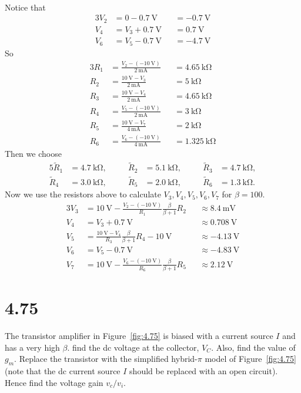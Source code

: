 \documentclass[12pt, a4paper]{article}
\begin{document}
\Ans \\
Notice that 
\begin{alignat*}{3}
  V_2 &= 0 - \SI{0.7}\V && = \SI{-0.7}{\V} \\
  V_4 &= V_3 + \SI{0.7}\V &&= \SI{0.7}\V \\
  V_6 &= V_5 - \SI{0.7}\V &&= \SI{-4.7}\V
\end{alignat*}
So 
\begin{alignat*}{3}
  R_1 &= \frac{V_2 - (\SI{-10}\V)}{\SI{2}\mA} &&= \SI{4.65}\kohm \\
  R_2 &= \frac{\SI{10}\V - V_3}{\SI{2}\mA} &&= \SI{5}\kohm \\
  R_3 &= \frac{\SI{10}\V - V_4}{\SI{2}\mA} &&= \SI{4.65}\kohm \\
  R_4 &= \frac{V_5 - (\SI{-10}\V)}{\SI{2}\mA} &&= \SI{3}\kohm \\
  R_5 &= \frac{\SI{10}\V - V_7}{\SI{4}\mA} &&= \SI{2}\kohm \\
  R_6 &= \frac{V_6 - (\SI{-10}\V)}{\SI{4}\mA} &&= \SI{1.325}\kohm
\end{alignat*}
Then we choose
\begin{alignat*}{5}
  \widetilde{R}_1 &= \SI{4.7}\kohm, && \quad \widetilde{R}_2 &= \SI{5.1}\kohm, && \quad \widetilde{R}_3 &= \SI{4.7}\kohm, \\
  \widetilde{R}_4 &= \SI{3.0}\kohm, && \quad \widetilde{R}_5 &= \SI{2.0}\kohm, && \quad \widetilde{R}_6 &= \SI{1.3}\kohm.
\end{alignat*}
Now we use the resistors above to calculate $V_3, V_4, V_5, V_6, V_7$
for $\beta = 100$.
\begin{alignat*}{3}
  V_3 &= \SI{10}{\V} - \frac{V_2 - (\SI{-10}\V)}{R_1}\frac{\beta}{\beta+1}R_2 && \approx \SI{8.4}{\mV} \\
  V_4 &= V_3 + \SI{0.7}{\V} && \approx \SI{0.708}{\V} \\
  V_5 &= \frac{\SI{10}\V - V_4}{R_3}\frac{\beta}{\beta+1}R_4 - \SI{10}{\V} && \approx \SI{-4.13}{\V} \\
  V_6 &= V_5 - \SI{0.7}{\V} && \approx \SI{-4.83}{\V} \\
  V_7 &= \SI{10}{\V} - \frac{V_6 - (\SI{-10}\V)}{R_6}\frac{\beta}{\beta+1}R_5 && \approx \SI{2.12}{\V}
\end{alignat*}

\section{4.75}
The transistor amplifier in Figure~\ref{fig:4.75} is biased with a current source $I$ and has a very high $\beta$. find the dc voltage at the collector, $V_C$. Also, find the value of $g_m$. Replace the transistor with the simplified hybrid-$\pi$ model of Figure~\ref{fig:4.75} (note that the dc current source $I$ should be replaced with an open circuit). Hence find the voltage gain $v_c/v_i$. 
\end{document}
